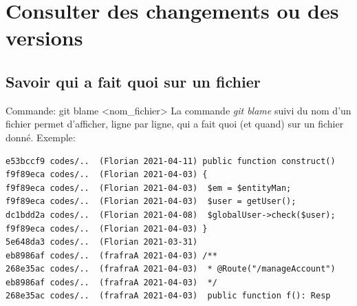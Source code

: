 \documentclass{beamer}
\begin{document}
\section{Consulter des changements ou des versions}

\subsection{Savoir qui a fait quoi sur un fichier}

\begin{frame}[fragile]{Commande: git blame <nom\_fichier>}
La commande \textit{git blame} suivi du nom d'un fichier permet d'afficher, ligne par ligne, qui a fait quoi (et quand) sur un fichier donné. Exemple:
\begin{mdframed}[style=Bash]
\begin{lstlisting}[style=Bash, caption={Exemple de git blame}]
e53bccf9 codes/..  (Florian 2021-04-11) public function construct()
f9f89eca codes/..  (Florian 2021-04-03) {
f9f89eca codes/..  (Florian 2021-04-03)  $em = $entityMan;
f9f89eca codes/..  (Florian 2021-04-03)  $user = getUser();
dc1bdd2a codes/..  (Florian 2021-04-08)  $globalUser->check($user);
f9f89eca codes/..  (Florian 2021-04-03) }
5e648da3 codes/..  (Florian 2021-03-31) 
eb8986af codes/..  (frafraA 2021-04-03) /**
268e35ac codes/..  (frafraA 2021-04-03)  * @Route("/manageAccount")
eb8986af codes/..  (frafraA 2021-04-03)  */
268e35ac codes/..  (frafraA 2021-04-03)  public function f(): Resp
\end{lstlisting}
\end{mdframed}
\end{frame}

\end{document}
